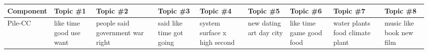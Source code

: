 \documentclass[11pt,a4paper]{article}
\begin{document}
\begin{appendices}
\begin{table}[htp]
\centering
\vspace{-1.5cm}
\begin{tiny}
\begin{tabular}{|p{}|p{}|p{}|p{}|p{}|p{}|p{}|p{}|p{}|}
\hline
Component & Topic \#1 & Topic \#2 & Topic \#3 & Topic \#4 & Topic \#5 & Topic \#6 & Topic \#7 & Topic \#8\\\hline
Pile-CC & like \newline time \newline good \newline use \newline want & people \newline said \newline government \newline war \newline right & said \newline like \newline time \newline got \newline going & system \newline surface \newline x \newline high \newline second & new \newline dating \newline art \newline day \newline city & like \newline time \newline game \newline good \newline food & water \newline plants \newline food \newline climate \newline plant & music \newline like \newline book \newline new \newline film\\\hline

\end{tabular}
\end{tiny}
\end{table}
\end{appendices}
\end{document}
